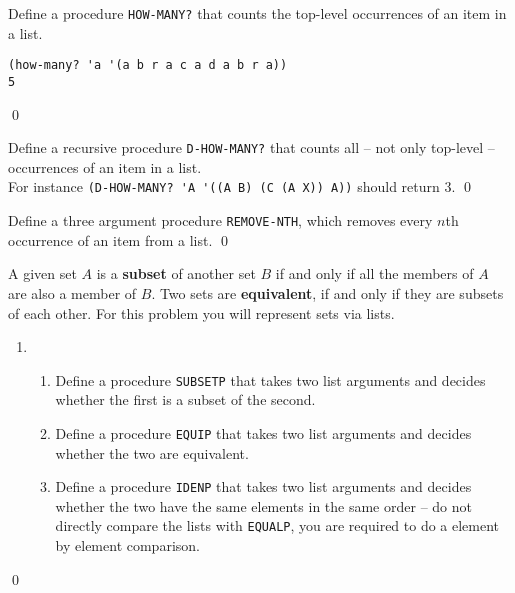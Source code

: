 \documentclass[a4paper,11pt]{article}
\begin{document}

\begin{uexercise}

Define a procedure \Verb+HOW-MANY?+ that counts the top-level occurrences of an item in a list.

\begin{Verbatim}
(how-many? 'a '(a b r a c a d a b r a))
5
\end{Verbatim}
\qed
\end{uexercise}

\begin{uexercise}
Define a recursive procedure \Verb+D-HOW-MANY?+ that counts all – not only top-level – occurrences of an item in a list.\\ For instance \Verb+(D-HOW-MANY? 'A '((A B) (C (A X)) A))+ should return 3. 
\qed
\end{uexercise}


\begin{uexercise}
Define a three argument procedure \Verb+REMOVE-NTH+, which removes every $n$th occurrence of an item from a list.
\qed
\end{uexercise}


\begin{uexercise}
A given set $A$ is a {\bf subset} of another set $B$ if and only if all the members of $A$ are also a member of $B$. Two sets are {\bf equivalent}, if and only if they are subsets of each other. For this problem you will represent sets via lists.
\begin{enumerate}
	\item[]
\begin{enumerate}
\item Define a procedure \Verb+SUBSETP+ that takes two list arguments and decides whether the first is a subset of the second.
\item Define a procedure \Verb+EQUIP+ that takes two list arguments and decides whether the two are equivalent.
\item Define a procedure \Verb+IDENP+ that takes two list arguments and decides whether the two have the same elements in the same order -- do not directly compare the lists with \Verb+EQUALP+, you are required to do a element by element comparison.
\end{enumerate}
\end{enumerate}
\qed
\end{uexercise}
\end{document}
